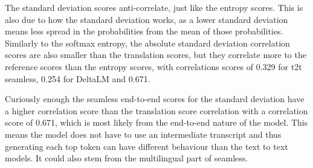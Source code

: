 The standard deviation scores anti-correlate, just like the entropy scores. This is also due to how the standard deviation works, as a lower standard deviation means less spread in the probabilities from the mean of those probabilities. 
Similarly to the softmax entropy, the absolute standard deviation correlation scores are also smaller than the translation scores, but they correlate more to the reference scores than the entropy scores, with correlations scores of 0.329 for t2t seamless, 0.254 for DeltaLM and 0.671.

Curiously enough the seamless end-to-end scores for the standard deviation have a higher correlation score than the translation score correlation with a correlation score of 0.671, which is most likely from the end-to-end nature of the model. This means the model does not have to use an intermediate transcript and thus generating each top token can have different behaviour than the text to text models. It could also stem from the multilingual part of seamless. 

